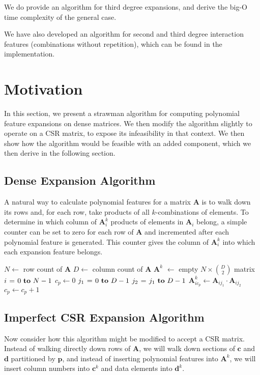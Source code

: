 \documentclass{article}
\begin{document}
We do provide an algorithm for third degree expansions, and derive the big-O time complexity of the general case.

We have also developed an algorithm for second and third degree interaction features (combinations without repetition), which can be found in the implementation.

\section{Motivation}
In this section, we present a strawman algorithm for computing polynomial feature expansions on dense matrices.
We then modify the algorithm  slightly to operate on a CSR matrix, to expose its infeasibility in that context.
We then show how the algorithm would be feasible with an added component, which we then derive in the following section.

\subsection{Dense Expansion Algorithm}
A natural way to calculate polynomial features for a matrix $\bm{A}$ is to walk down its rows and, for each row, take products of all $k$-combinations of elements.
To determine in which column of $\bm{A}^k_i$ products of elements in $\bm{A}_i$ belong, a simple counter can be set to zero for each row of $\bm{A}$ and incremented after each polynomial feature is generated.
This counter gives the column of $\bm{A}^k_i$ into which each expansion feature belongs.

\begin{codebox}
\footnotesize
{}
    \li $N \gets$ row count of $\bm{A}$
    \li $D \gets$ column count of $\bm{A}$
    \li $\bm{A}^k$ $\gets$ empty $N \times \binom{D}{2}$ matrix
    \li \For $i \gets 0 \To N-1$ \Do
    \li     $c_p \gets 0$
    \li     \For $j_1 \gets 0 \To D-1$ \Do
    \li         \For $j_2 \gets j_1 \To D-1$ \Do
    \li             $\bm{A}^k_{i{c_p}} \gets \bm{A}_{ij_1} \cdot \bm{A}_{ij_2}$
    \li             $c_p \gets c_p + 1$
                \End
            \End
       	\End
\end{codebox}

\subsection{Imperfect CSR Expansion Algorithm}
\label{sec:final-algo}
Now consider how this algorithm might be modified to accept a CSR matrix.
Instead of walking directly down rows of $\bm{A}$, we will walk down sections of $\bm{c}$ and $\bm{d}$ partitioned by $\bm{p}$, and instead of inserting polynomial features into $\bm{A}^k$, we will insert column numbers into $\bm{c}^k$ and data elements into $\bm{d}^k$.
\end{document}
